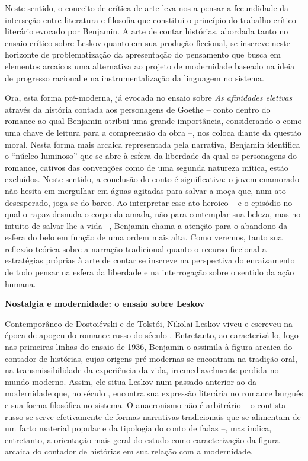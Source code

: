 Neste sentido, o conceito de crítica de arte leva-nos a pensar a
fecundidade da interseção entre literatura e filosofia que constitui o
princípio do trabalho crítico-literário evocado por Benjamin. A arte de
contar histórias, abordada tanto no ensaio crítico sobre Leskov quanto
em sua produção ficcional, se inscreve neste horizonte de
problematização da apresentação do pensamento que busca em elementos
arcaicos uma alternativa ao projeto de modernidade baseado na ideia de
progresso racional e na instrumentalização da linguagem no sistema.

Ora, esta forma pré-moderna, já evocada no ensaio sobre \emph{As
afinidades eletivas} através da história contada aos personagens de
Goethe -- conto dentro do romance ao qual Benjamin atribui uma grande
importância, considerando-o como uma chave de leitura para a compreensão
da obra --, nos coloca diante da questão moral. Nesta forma mais arcaica
representada pela narrativa, Benjamin identifica o ``núcleo luminoso''
que se abre à esfera da liberdade da qual os personagens do romance,
cativos das convenções como de uma segunda natureza mítica, estão
excluídos. Neste sentido, a conclusão do conto é significativa: o jovem
enamorado não hesita em mergulhar em águas agitadas para salvar a moça
que, num ato desesperado, joga-se do barco. Ao interpretar esse ato
heroico -- e o episódio no qual o rapaz desnuda o corpo da amada, não
para contemplar sua beleza, mas no intuito de salvar-lhe a vida --,
Benjamin chama a atenção para o abandono da esfera do belo em função de
uma ordem mais alta. Como veremos, tanto sua reflexão teórica sobre a
narração tradicional quanto o recurso ficcional a estratégias próprias à
arte de contar se inscreve na perspectiva do enraizamento de todo pensar
na esfera da liberdade e na interrogação sobre o sentido da ação humana.

\textbf{Nostalgia e modernidade: o ensaio sobre Leskov}

Contemporâneo de Dostoiévski e de Tolstói, Nikolai Leskov viveu e
escreveu na época de apogeu do romance russo do século . Entretanto,
ao caracterizá-lo, logo nas primeiras linhas do ensaio de 1936, Benjamin
o assimila à figura arcaica do contador de histórias, cujas origens
pré-modernas se encontram na tradição oral, na transmissibilidade da
experiência da vida, irremediavelmente perdida no mundo moderno. Assim,
ele situa Leskov num passado anterior ao da modernidade que, no século
, encontra sua expressão literária no romance burguês e sua forma
filosófica no sistema. O anacronismo não é arbitrário -- o contista
russo se serve efetivamente de formas narrativas tradicionais que se
alimentam de um farto material popular e da tipologia do conto de fadas
--, mas indica, entretanto, a orientação mais geral do estudo como
caracterização da figura arcaica do contador de histórias em sua relação
com a modernidade.

